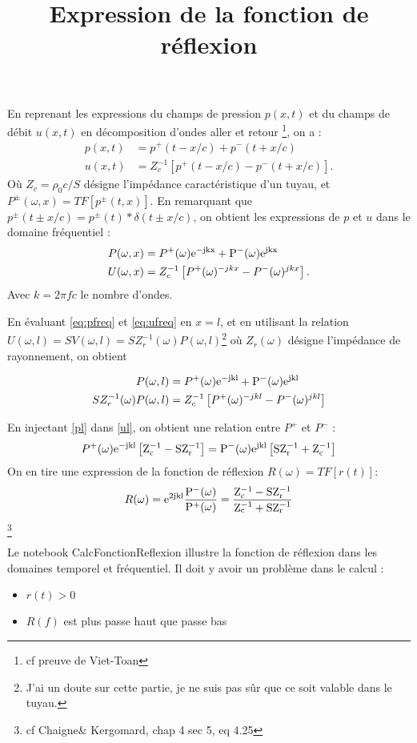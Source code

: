 \documentclass{article}
\title{Expression de la fonction de réflexion }
\author{}
\date{}
\newcommand{\powinv}{^{-1}}
\begin{document}
\maketitle

En reprenant les expressions du champs de pression $p(x, t)$ et du champs de débit $u(x, t)$ en décomposition d'ondes aller et retour \footnote{cf preuve de Viet-Toan}, on a :
\begin{align}
p(x, t) & = p^+(t-x/c)+p^-(t+x/c)\\
u(x,t) & = Z_c^{-1}[p^+(t-x/c)-p^-(t+x/c)].
\end{align}
Où $Z_c=\rho_0c/S$ désigne l'impédance caractéristique d'un tuyau, et $P^{\pm}(\omega, x)=TF[p^{\pm}(t, x)]$. En remarquant que $p^{\pm}(t\pm x/c)=p^{\pm}(t)\ast\delta(t\pm x/c)$, on obtient les expressions de $p$ et $u$ dans le domaine fréquentiel :
\begin{align}
P(\omega, x) & =P^+(\omega)\rm{e}^{-jkx}+P^-(\omega)\rm{e}^{jkx} \label{eq:pfreq}\\ 
U(\omega, x) & = Z_c^{-1}\left[P^+(\omega)^{-jkx}-P^-(\omega)^{jkx}\right]\label{eq:ufreq}.
\end{align}
Avec $k=2\pi fc$ le nombre d'ondes.\par

En évaluant \ref{eq:pfreq} et \ref{eq:ufreq} en $x=l$, et en utilisant la relation $U(\omega, l)=SV(\omega, l)=SZ_r\powinv(\omega)P(\omega, l)$\footnote{J'ai un doute sur cette partie, je ne suis pas sûr que ce soit valable dans le tuyau.} où $Z_r(\omega)$ désigne l'impédance de rayonnement, on obtient

\begin{align}
P(\omega, l) & =P^+(\omega)\rm{e}^{-jkl}+P^-(\omega)\rm{e}^{jkl}\label{pl}\\ 
SZ_r\powinv(\omega)P(\omega, l) & = Z_c^{-1}\left[P^+(\omega)^{-jkl}-P^-(\omega)^{jkl}\right]\label{ul}
\end{align}

En injectant \ref{pl} dans \ref{ul}, on obtient une relation entre $P^+$ et $P^-$ :
\begin{align}
P^+(\omega)\rm{e}^{-jkl}\left[Z_c\powinv-SZ_r\powinv\right]=P^-(\omega)\rm{e}^{jkl}\left[SZ_r\powinv+Z_c\powinv\right]
\end{align}
On en tire une expression de la fonction de réflexion $R(\omega)=TF[r(t)]$:
\begin{align}
R(\omega)=\rm{e}^{2jkl}\frac{P^-(\omega)}{P^+(\omega)}=\frac{Z_c\powinv-SZ_r\powinv}{Z_c\powinv+SZ_r\powinv}
\end{align}\footnote{cf Chaigne\& Kergomard, chap 4 sec 5, eq 4.25}

Le notebook CalcFonctionReflexion illustre la fonction de réflexion dans les domaines temporel et fréquentiel. Il doit y avoir un problème dans le calcul : 
\begin{itemize}
\item $r(t)>0$
\item $R(f)$ est plus passe haut que passe bas
\end{itemize}
\end{document}
